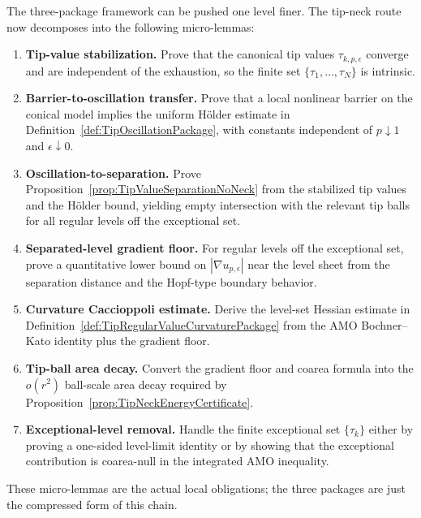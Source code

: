 \begin{remark}\label{rem:TipNeckMicroRoadmap}
The three-package framework can be pushed one level finer.  The tip-neck route
now decomposes into the following micro-lemmas:
\begin{enumerate}
    \item \textbf{Tip-value stabilization.}
    Prove that the canonical tip values \(\tau_{k,p,\epsilon}\) converge and
    are independent of the exhaustion, so the finite set
    \(\{\tau_1,\ldots,\tau_N\}\) is intrinsic.

    \item \textbf{Barrier-to-oscillation transfer.}
    Prove that a local nonlinear barrier on the conical model implies the
    uniform Hölder estimate in Definition~\ref{def:TipOscillationPackage},
    with constants independent of \(p\downarrow1\) and \(\epsilon\downarrow0\).

    \item \textbf{Oscillation-to-separation.}
    Prove Proposition~\ref{prop:TipValueSeparationNoNeck} from the stabilized
    tip values and the Hölder bound, yielding empty intersection with the
    relevant tip balls for all regular levels off the exceptional set.

    \item \textbf{Separated-level gradient floor.}
    For regular levels off the exceptional set, prove a quantitative lower
    bound on \(|\nabla u_{p,\epsilon}|\) near the level sheet from the
    separation distance and the Hopf-type boundary behavior.

    \item \textbf{Curvature Caccioppoli estimate.}
    Derive the level-set Hessian estimate in
    Definition~\ref{def:TipRegularValueCurvaturePackage} from the AMO
    Bochner--Kato identity plus the gradient floor.

    \item \textbf{Tip-ball area decay.}
    Convert the gradient floor and coarea formula into the \(o(r^2)\)
    ball-scale area decay required by
    Proposition~\ref{prop:TipNeckEnergyCertificate}.

    \item \textbf{Exceptional-level removal.}
    Handle the finite exceptional set \(\{\tau_k\}\) either by proving a
    one-sided level-limit identity or by showing that the exceptional
    contribution is coarea-null in the integrated AMO inequality.
\end{enumerate}
These micro-lemmas are the actual local obligations; the three packages are
just the compressed form of this chain.
\end{remark}


